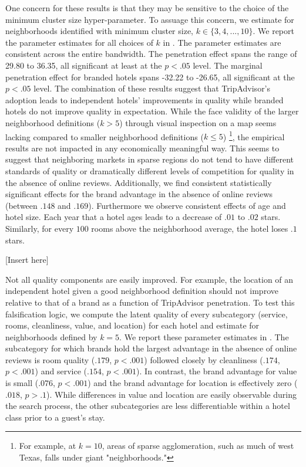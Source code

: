 \documentclass[mksc,blindrev]{informs3} %
\begin{document}
One concern for these results is that they may be sensitive to the choice of the minimum cluster size hyper-parameter. To assuage this concern, we estimate  for neighborhoods identified with minimum cluster size, $k\in\{3,4,...,10\}$. We report the parameter estimates for all choices of $k$ in . The parameter estimates are consistent across the entire bandwidth. The penetration effect spans the range of 29.80 to 36.35, all significant at least at the $p<.05$ level. The marginal penetration effect for branded hotels spans -32.22 to -26.65, all significant at the $p<.05$ level. The combination of these results suggest that TripAdvisor's adoption leads to independent hotels' improvements in quality while branded hotels do not improve quality in expectation. While the face validity of the larger neighborhood definitions ($k>5$) through visual inspection on a map seems lacking compared to smaller neighborhood definitions ($k\le 5$) \footnote{For example, at $k=10$, areas of sparse agglomeration, such as much of west Texas, falls under giant "neighborhoods."}, the empirical results are not impacted in any economically meaningful way. This seems to suggest that neighboring markets in sparse regions do not tend to have different standards of quality or dramatically different levels of competition for quality in the absence of online reviews. Additionally, we find consistent statistically significant effects for the brand advantage in the absence of online reviews (between $.148$ and $.169$). Furthermore we observe consistent effects of age and hotel size. Each year that a hotel ages leads to a decrease of $.01$ to $.02$ stars. Similarly, for every $100$ rooms above the neighborhood average, the hotel loses $.1$ stars.

[Insert  here]

Not all quality components are easily improved. For example, the location of an independent hotel given a good neighborhood definition should not improve relative to that of a brand as a function of TripAdvisor penetration. To test this falsification logic, we compute the latent quality of every subcategory (service, rooms, cleanliness, value, and location) for each hotel and estimate  for neighborhoods defined by $k=5$. We report these parameter estimates in . The subcategory for which brands hold the largest advantage in the absence of online reviews is room quality ($.179$, $p<.001$) followed closely by cleanliness ($.174$, $p<.001$) and service ($.154$, $p<.001$). In contrast, the brand advantage for value is small ($.076$, $p<.001$) and the brand advantage for location is effectively zero ($.018$, $p>.1$). While differences in value and location are easily observable during the search process, the other subcategories are less differentiable within a hotel class prior to a guest's stay. 
\end{document}
